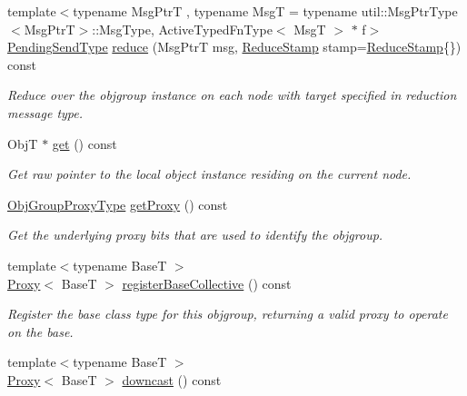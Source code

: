 \begin{DoxyCompactItemize}
{\footnotesize template$<$typename Msg\+PtrT , typename MsgT  = typename util\+::\+Msg\+Ptr\+Type$<$\+Msg\+Ptr\+T$>$\+::\+Msg\+Type, Active\+Typed\+Fn\+Type$<$ Msg\+T $>$ $\ast$ f$>$ }\\\hyperlink{structvt_1_1objgroup_1_1proxy_1_1_proxy_a1bdf8713203531d306702a024872bb08}{Pending\+Send\+Type} \hyperlink{structvt_1_1objgroup_1_1proxy_1_1_proxy_ad481da6a8dff55801daa9250420bae9c}{reduce} (Msg\+PtrT msg, \hyperlink{structvt_1_1objgroup_1_1proxy_1_1_proxy_a337be4c20cf11ff6477c7a66208cc909}{Reduce\+Stamp} stamp=\hyperlink{structvt_1_1objgroup_1_1proxy_1_1_proxy_a337be4c20cf11ff6477c7a66208cc909}{Reduce\+Stamp}\{\}) const
\begin{DoxyCompactList}\small\item\em Reduce over the objgroup instance on each node with target specified in reduction message type. \end{DoxyCompactList}\item 
ObjT $\ast$ \hyperlink{structvt_1_1objgroup_1_1proxy_1_1_proxy_a62eef779c097c8398e249827e4ad7c6a}{get} () const
\begin{DoxyCompactList}\small\item\em Get raw pointer to the local object instance residing on the current node. \end{DoxyCompactList}\item 
\hyperlink{namespacevt_ad7cae989df485fccca57f0792a880a8e}{Obj\+Group\+Proxy\+Type} \hyperlink{structvt_1_1objgroup_1_1proxy_1_1_proxy_a76cda2351cf7801abe2ebffa1403c5b8}{get\+Proxy} () const
\begin{DoxyCompactList}\small\item\em Get the underlying proxy bits that are used to identify the objgroup. \end{DoxyCompactList}\item 
{\footnotesize template$<$typename BaseT $>$ }\\\hyperlink{structvt_1_1objgroup_1_1proxy_1_1_proxy}{Proxy}$<$ BaseT $>$ \hyperlink{structvt_1_1objgroup_1_1proxy_1_1_proxy_a3504fe25af8c839995a98d445af37282}{register\+Base\+Collective} () const
\begin{DoxyCompactList}\small\item\em Register the base class type for this objgroup, returning a valid proxy to operate on the base. \end{DoxyCompactList}\item 
{\footnotesize template$<$typename BaseT $>$ }\\\hyperlink{structvt_1_1objgroup_1_1proxy_1_1_proxy}{Proxy}$<$ BaseT $>$ \hyperlink{structvt_1_1objgroup_1_1proxy_1_1_proxy_ae672794dc83491200d7f6e794865a6bc}{downcast} () const

\end{DoxyCompactItemize}
